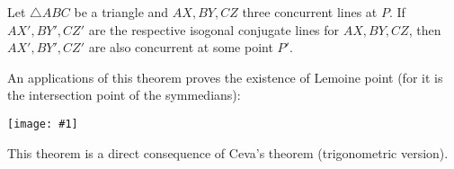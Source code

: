 \documentclass[12pt]{article}
\newcommand{\figura}[1]{\begin{center}\texttt{[image: \#1]}\end{center}}
\begin{document}
Let $\triangle ABC$ be a triangle and $AX, BY, CZ$ three concurrent lines at $P$.
If $AX',BY', CZ'$ are the respective isogonal conjugate lines for $AX,BY,CZ$, then $AX', BY',CZ'$ are also concurrent at some point $P'$.

An applications of this theorem proves the existence of Lemoine point (for it is the intersection point of the symmedians):
\figura{lemoinep}

This theorem is a direct consequence of Ceva's theorem (trigonometric version).
\end{document}
